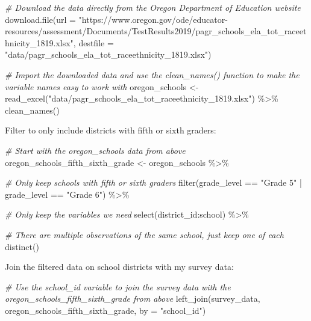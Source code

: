 \documentclass[
]{book}
\newenvironment{Shaded}{\begin{snugshade}}{\end{snugshade}}
\newcommand{\AttributeTok}[1]{\textcolor[rgb]{0.77,0.63,0.00}{#1}}
\newcommand{\CommentTok}[1]{\textcolor[rgb]{0.56,0.35,0.01}{\textit{#1}}}
\newcommand{\FunctionTok}[1]{\textcolor[rgb]{0.00,0.00,0.00}{#1}}
\newcommand{\NormalTok}[1]{#1}
\newcommand{\OtherTok}[1]{\textcolor[rgb]{0.56,0.35,0.01}{#1}}
\newcommand{\SpecialCharTok}[1]{\textcolor[rgb]{0.00,0.00,0.00}{#1}}
\newcommand{\StringTok}[1]{\textcolor[rgb]{0.31,0.60,0.02}{#1}}
\begin{document}
\begin{Shaded}
\begin{Highlighting}[]
\CommentTok{\# Download the data directly from the Oregon Department of Education website}
\FunctionTok{download.file}\NormalTok{(}\AttributeTok{url =} \StringTok{"https://www.oregon.gov/ode/educator{-}resources/assessment/Documents/TestResults2019/pagr\_schools\_ela\_tot\_raceethnicity\_1819.xlsx"}\NormalTok{,}
              \AttributeTok{destfile =} \StringTok{"data/pagr\_schools\_ela\_tot\_raceethnicity\_1819.xlsx"}\NormalTok{)}

\CommentTok{\# Import the downloaded data and use the \textasciigrave{}clean\_names()\textasciigrave{} function to make the variable names easy to work with}
\NormalTok{oregon\_schools }\OtherTok{\textless{}{-}} \FunctionTok{read\_excel}\NormalTok{(}\StringTok{"data/pagr\_schools\_ela\_tot\_raceethnicity\_1819.xlsx"}\NormalTok{) }\SpecialCharTok{\%\textgreater{}\%} 
  \FunctionTok{clean\_names}\NormalTok{()}
\end{Highlighting}
\end{Shaded}

Filter to only include districts with fifth or sixth graders:

\begin{Shaded}
\begin{Highlighting}[]
\CommentTok{\# Start with the oregon\_schools data from above}
\NormalTok{oregon\_schools\_fifth\_sixth\_grade }\OtherTok{\textless{}{-}}\NormalTok{ oregon\_schools }\SpecialCharTok{\%\textgreater{}\%} 
  
  \CommentTok{\# Only keep schools with fifth or sixth graders}
  \FunctionTok{filter}\NormalTok{(grade\_level }\SpecialCharTok{==} \StringTok{"Grade 5"} \SpecialCharTok{|}\NormalTok{ grade\_level }\SpecialCharTok{==} \StringTok{"Grade 6"}\NormalTok{) }\SpecialCharTok{\%\textgreater{}\%} 
  
  \CommentTok{\# Only keep the variables we need}
  \FunctionTok{select}\NormalTok{(district\_id}\SpecialCharTok{:}\NormalTok{school) }\SpecialCharTok{\%\textgreater{}\%} 
  
  \CommentTok{\# There are multiple observations of the same school, just keep one of each}
  \FunctionTok{distinct}\NormalTok{()}
\end{Highlighting}
\end{Shaded}

Join the filtered data on school districts with my survey data:

\begin{Shaded}
\begin{Highlighting}[]
\CommentTok{\# Use the school\_id variable to join the survey data with the oregon\_schools\_fifth\_sixth\_grade from above }
\FunctionTok{left\_join}\NormalTok{(survey\_data, oregon\_schools\_fifth\_sixth\_grade,}
          \AttributeTok{by =} \StringTok{"school\_id"}\NormalTok{)}
\end{Highlighting}
\end{Shaded}
\end{document}
